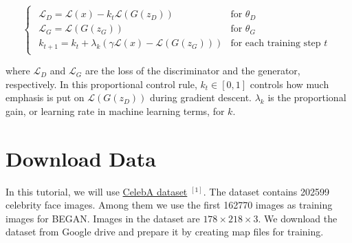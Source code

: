 \documentclass[]{book}
\newenvironment{Shaded}{\begin{snugshade}}{\end{snugshade}}
\newcommand{\CommentTok}[1]{\textcolor[rgb]{0.56,0.35,0.01}{\textit{#1}}}
\theoremstyle{definition}
\theoremstyle{definition}
\theoremstyle{definition}
\theoremstyle{remark}
\begin{document}
\[\begin{cases}
    \begin{array}{ll}
        \mathcal{L}_D = \mathcal{L}(x) - k_t \mathcal{L}(G(z_D))&\textrm{for }\theta_D\\
        \mathcal{L}_G = \mathcal{L}(G(z_G))&\textrm{for }\theta_G\\
        k_{t+1} = k_t + \lambda_k(\gamma \mathcal{L}(x)-\mathcal{L}(G(z_G)))&\textrm{for each training step }t
    \end{array}
   \end{cases}\]

where \(\mathcal{L}_D\) and \(\mathcal{L}_G\) are the loss of the
discriminator and the generator, respectively. In this proportional
control rule, \(k_t\in[0,1]\) controls how much emphasis is put on
\(\mathcal{L}(G(z_D))\) during gradient descent. \(\lambda_k\) is the
proportional gain, or learning rate in machine learning terms, for
\(k\).

\section{Download Data}\label{download-data-1}

In this tutorial, we will use
\href{http://mmlab.ie.cuhk.edu.hk/projects/CelebA.html}{CelebA dataset}
\(^{[1]}\). The dataset contains 202599 celebrity face images. Among
them we use the first 162770 images as training images for BEGAN. Images
in the dataset are \(178\times218\times3\). We download the dataset from
Google drive and prepare it by creating map files for training.

\begin{Shaded}
\end{Shaded}
\end{document}
